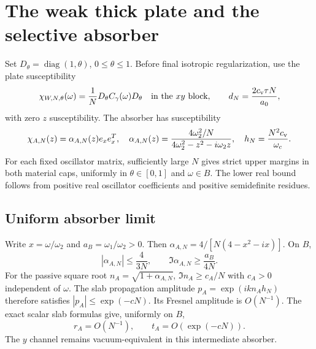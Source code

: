 \documentclass[11pt]{article}
\newcommand{\abs}[1]{\left|#1\right|}
\newcommand{\ex}{e_x}
\begin{document}
\section{The weak thick plate and the selective absorber}
Set $D_\theta=\operatorname{diag}(1,\theta)$, $0\le\theta\le1$. Before final
isotropic regularization, use the plate susceptibility
\begin{equation}\label{eq:plate}
 \chi_{W,N,\theta}(\omega)=
 \frac1N D_\theta C_\gamma(\omega)D_\theta
 \quad\text{in the $xy$ block},\qquad
 d_N=\frac{2c_{\rm v}\tau N}{a_0},
\end{equation}
with zero $z$ susceptibility. The absorber has susceptibility
\begin{equation}\label{eq:absorber}
 \chi_{A,N}(z)=\alpha_{A,N}(z)\ex\ex^T,\quad
 \alpha_{A,N}(z)=\frac{4\omega_2^2/N}
                         {4\omega_2^2-z^2-i\omega_2 z},\quad
 h_N=\frac{N^2c_{\rm v}}{\omega_c}.
\end{equation}
For each fixed oscillator matrix, sufficiently large $N$ gives strict upper
margins in both material caps, uniformly in $\theta\in[0,1]$ and $\omega\in B$.
The lower real bound follows from positive real oscillator coefficients and
positive semidefinite residues.

\subsection{Uniform absorber limit}
Write $x=\omega/\omega_2$ and $a_B=\omega_1/\omega_2>0$. Then
$\alpha_{A,N}=4/[N(4-x^2-ix)]$. On $B$,
\[
 \abs{\alpha_{A,N}}\le\frac4{3N},\qquad
 \Im\alpha_{A,N}\ge\frac{a_B}{4N}.
\]
For the passive square root $n_A=\sqrt{1+\alpha_{A,N}}$,
$\Im n_A\ge c_A/N$ with $c_A>0$ independent of $\omega$.
The slab propagation amplitude $p_A=\exp(ikn_Ah_N)$ therefore satisfies
$\abs{p_A}\le\exp(-cN)$. Its Fresnel amplitude is $O(N^{-1})$. The exact
scalar slab formulas give, uniformly on $B$,
\begin{equation}\label{eq:absorber-limit}
 r_A=O(N^{-1}),\qquad t_A=O(\exp(-cN)).
\end{equation}
The $y$ channel remains vacuum-equivalent in this intermediate absorber.
\end{document}
